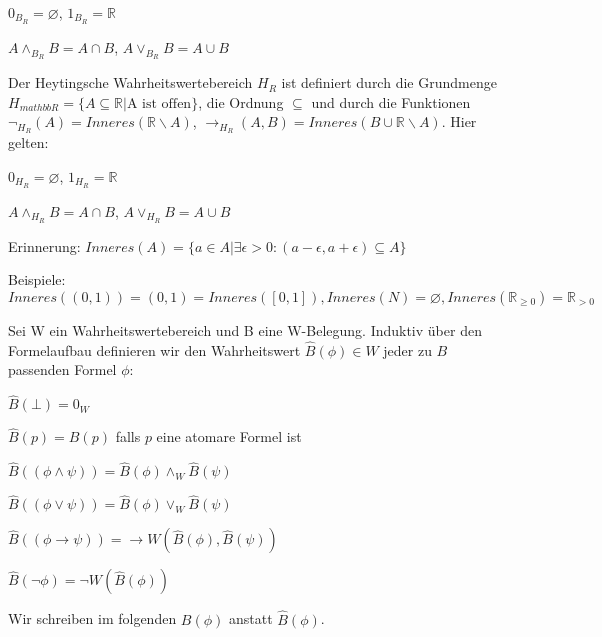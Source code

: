 \documentclass[a4paper]{article}
\begin{document}
\begin{multicols}{3}
\begin{itemize*}
    \begin{itemize*}
      \item $0_{B_R}=\varnothing$, $1_{B_R}=\mathbb{R}$
      \item $A\wedge_{B_R} B=A\cap B$, $A\vee_{B_R} B=A\cup B$
    \end{itemize*}
    \item Der Heytingsche Wahrheitswertebereich $H_R$ ist definiert durch die Grundmenge $H_{mathbb{R}} =\{A\subseteq\mathbb{R} | \text{A ist offen}\}$, die Ordnung $\subseteq$ und durch die Funktionen $\lnot_{H_R} (A) = Inneres(\mathbb{R}\backslash A)$, $\rightarrow_{H_R} (A,B) =Inneres(B\cup \mathbb{R}\backslash A)$. Hier gelten:
    \begin{itemize*}
      \item $0_{H_R}=\varnothing$, $1_{H_R}=\mathbb{R}$
      \item $A\wedge_{H_R} B= A\cap B$, $A\vee_{H_R} B=A\cup B$
      \item Erinnerung: $Inneres(A) =\{a\in A|\exists \epsilon > 0 : (a-\epsilon,a+\epsilon)\subseteq A\}$
      \item Beispiele: $Inneres((0,1))=(0,1)=Inneres([0,1]),Inneres(N)=\varnothing,Inneres(\mathbb{R}_{\geq 0}) = \mathbb{R}_{> 0}$
    \end{itemize*}
  \end{itemize*}


  Sei W ein Wahrheitswertebereich und B eine W-Belegung. Induktiv über den Formelaufbau definieren wir den Wahrheitswert $\hat{B}(\phi)\in W$ jeder zu $B$ passenden Formel $\phi$:
  \begin{itemize*}
    \item $\hat{B}(\bot) = 0_W$
    \item $\hat{B}(p) = B(p)$ falls $p$ eine atomare Formel ist
    \item $\hat{B}((\phi\wedge \psi )) = \hat{B}(\phi)\wedge_W \hat{B}(\psi )$
    \item $\hat{B}((\phi\vee \psi )) = \hat{B}(\phi)\vee_W \hat{B}(\psi )$
    \item $\hat{B}((\phi\rightarrow \psi )) = \rightarrow W(\hat{B}(\phi),\hat{B}(\psi ))$
    \item $\hat{B}(\lnot\phi) = \lnot W(\hat{B}(\phi))$
  \end{itemize*}

  Wir schreiben im folgenden $B(\phi)$ anstatt $\hat{B}(\phi)$.


\end{multicols}
\end{document}

